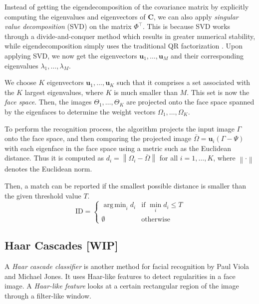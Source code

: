 Instead of getting the eigendecomposition of the covariance matrix by explicitly computing the eigenvalues and eigenvectors of $\mathbf{C}$, we can also apply \textit{singular value decomposition} (SVD) on the matrix $\Phi^\top$. This is because SVD works through a divide-and-conquer method which results in greater numerical stability, while eigendecomposition simply uses the traditional QR factorization \cite{nakatsukasa_stable_2013, gu_divide-and-conquer_1995}. Upon applying SVD, we now get the eigenvectors $\mathbf{u}_1, \ldots, \mathbf{u}_M$ and their corresponding eigenvalues $\lambda_1, \ldots, \lambda_M$.

We choose $K$ eigenvectors $\mathbf{u}_1, \ldots, \mathbf{u}_K$ such that it comprises a set associated with the $K$ largest eigenvalues, where $K$ is much smaller than $M$. This set is now the \textit{face space}. Then, the images $\Theta_1, \ldots, \Theta_K$ are projected onto the face space spanned by the eigenfaces to determine the weight vectors $\Omega_1, \ldots, \Omega_K$.

To perform the recognition process, the algorithm projects the input image $\Gamma$ onto the face space, and then comparing the projected image $\bar{\Omega} = \mathbf{u}_i\left(\Gamma - \Psi\right)$ with each eigenface in the face space using a metric such as the Euclidean distance. Thus it is computed as $d_i = \left\lVert \Omega_i -\bar{\Omega} \right\rVert$ for all $i=1,\ldots,K$, where $\left\lVert \cdot \right\rVert$ denotes the Euclidean norm.

Then, a match can be reported if the smallest possible distance is smaller than the given threshold value $T$. 
\newcommand{\argmin}{\mathop{\mathrm{arg\,min}}}  
\[\text{ID} = \begin{cases}\argmin_i d_i & \text{if } \min_i d_i \le T \\\emptyset & \text {otherwise}\end{cases}
\]

\subsection{Haar Cascades [WIP]}
A \textit{Haar cascade classifier} is another method for facial recognition by Paul Viola and Michael Jones. It uses Haar-like features to detect regularities in a face image. A \textit{Haar-like feature} looks at a certain rectangular region of the image through a filter-like window.

